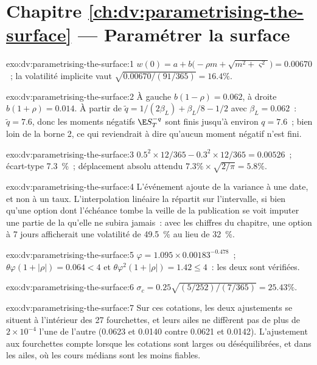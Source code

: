 \section*{Chapitre \ref{ch:dv:parametrising-the-surface} --- Paramétrer la surface}

\begin{solution}{exo:dv:parametrising-the-surface:1}
$w(0)=a+b\bigl(-\rho m+\sqrt{m^2+\varsigma^2}\bigr)=0.00670$~; la volatilité implicite vaut
$\sqrt{0.00670/(91/365)}=16.4\%$.
\end{solution}

\begin{solution}{exo:dv:parametrising-the-surface:2}
À gauche $b(1-\rho)=0.062$, à droite $b(1+\rho)=0.014$. À partir de $\tilde q=1/(2\beta_L)+\beta_L/8-1/2$ avec
$\beta_L=0.062$~: $\tilde q=7.6$, donc les moments négatifs $\E S_T^{-q}$ sont finis jusqu'à environ $q=7.6$~; bien
loin de la borne 2, ce qui reviendrait à dire qu'aucun moment négatif n'est fini.
\end{solution}

\begin{solution}{exo:dv:parametrising-the-surface:3}
$0.5^2\times12/365-0.3^2\times12/365=0.00526$~; écart-type 7.3~\%~; déplacement absolu attendu
$7.3\%\times\sqrt{2/\pi}=5.8\%$.
\end{solution}

\begin{solution}{exo:dv:parametrising-the-surface:4}
L'événement ajoute de la variance à une date, et non à un taux. L'interpolation linéaire la répartit sur l'intervalle,
si bien qu'une option dont l'échéance tombe la veille de la publication se voit imputer une partie de la  qu'elle ne subira
jamais~: avec les chiffres du chapitre, une option à 7 jours afficherait une volatilité de 49.5~\% au lieu de 32~\%.
\end{solution}

\begin{solution}{exo:dv:parametrising-the-surface:5}
$\varphi=1.095\times0.00183^{-0.478}$~; $\theta\varphi(1+|\rho|)=0.064<4$ et
$\theta\varphi^2(1+|\rho|)=1.42\le4$~: les deux sont vérifiées.
\end{solution}

\begin{solution}{exo:dv:parametrising-the-surface:6}
$\sigma_c=0.25\sqrt{(5/252)/(7/365)}=25.43\%$.
\end{solution}

\begin{solution}{exo:dv:parametrising-the-surface:7}
Sur ces cotations, les deux ajustements se situent à l'intérieur des 27 fourchettes, et leurs ailes ne diffèrent pas de plus de $2\times10^{-4}$ l'une de
l'autre (0.0623 et 0.0140 contre 0.0621 et 0.0142). L'ajustement aux fourchettes compte lorsque les cotations sont larges ou
déséquilibrées, et dans les ailes, où les cours médians sont les moins fiables.
\end{solution}

